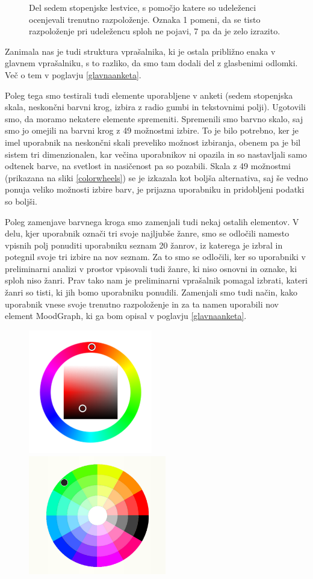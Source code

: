\documentclass[a4paper, 12pt]{book}
\begin{document}
{\begin{figure}[ht]
\caption{Del sedem stopenjske lestvice, s pomočjo katere so udeleženci ocenjevali trenutno razpoloženje. Oznaka 1 pomeni, da se tisto razpoloženje pri udeležencu sploh ne pojavi, 7 pa da je zelo izrazito. }
\label{skala}
\end{figure}

Zanimala nas je tudi struktura vprašalnika, ki je ostala približno enaka v glavnem vprašalniku, s to razliko, da smo tam dodali del z glasbenimi odlomki. Več o tem v poglavju \ref{glavnaanketa}.

Poleg tega smo testirali tudi elemente uporabljene v anketi (sedem stopenjska skala, neskončni barvni krog, izbira z radio gumbi in tekstovnimi polji). Ugotovili smo, da moramo nekatere elemente spremeniti. Spremenili smo barvno skalo, saj smo jo omejili na barvni krog z 49 možnostmi izbire. To je bilo potrebno, ker je imel uporabnik na neskončni skali preveliko možnost izbiranja, obenem pa je bil sistem tri dimenzionalen, kar večina uporabnikov ni opazila in so nastavljali samo odtenek barve, na svetlost in nasičenost pa so pozabili. Skala z 49 možnostmi (prikazana na sliki \ref{colorwheels}) se je izkazala kot boljša alternativa, saj še vedno ponuja veliko možnosti izbire barv, je prijazna uporabniku in pridobljeni podatki so boljši.

Poleg zamenjave barvnega kroga smo zamenjali tudi nekaj ostalih elementov. V delu, kjer uporabnik označi tri svoje najljubše žanre, smo se odločili namesto vpisnih polj ponuditi uporabniku seznam 20 žanrov, iz katerega je izbral in potegnil svoje tri izbire na nov seznam.  Za to smo se odločili, ker so uporabniki v preliminarni analizi v prostor vpisovali tudi žanre, ki niso osnovni in oznake, ki sploh niso žanri. Prav tako nam je preliminarni vprašalnik pomagal izbrati, kateri žanri so tisti, ki jih bomo uporabniku ponudili. Zamenjali smo tudi način, kako uporabnik vnese svoje trenutno razpoloženje in za ta namen uporabili nov element MoodGraph, ki ga bom opisal v poglavju \ref{glavnaanketa}. 

\begin{figure}[ht]
\centering
\includegraphics[width=54mm]{colorwheelold.png}
\includegraphics[width=60mm]{colorwheel.png}


\end{figure}}
\end{document}
